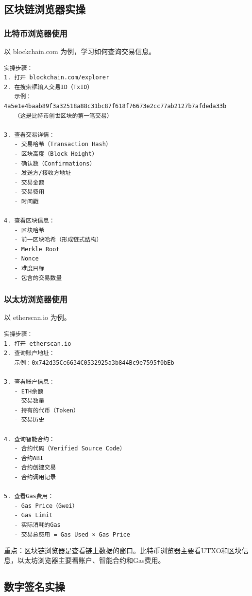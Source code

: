 ﻿\documentclass[12pt,a4paper]{article}
\begin{document}
\subsection{区块链浏览器实操}

\subsubsection{比特币浏览器使用}

以 blockchain.com 为例，学习如何查询交易信息。

\begin{lstlisting}
实操步骤：
1. 打开 blockchain.com/explorer
2. 在搜索框输入交易ID（TxID）
   示例：4a5e1e4baab89f3a32518a88c31bc87f618f76673e2cc77ab2127b7afdeda33b
   （这是比特币创世区块的第一笔交易）

3. 查看交易详情：
   - 交易哈希（Transaction Hash）
   - 区块高度（Block Height）
   - 确认数（Confirmations）
   - 发送方/接收方地址
   - 交易金额
   - 交易费用
   - 时间戳

4. 查看区块信息：
   - 区块哈希
   - 前一区块哈希（形成链式结构）
   - Merkle Root
   - Nonce
   - 难度目标
   - 包含的交易数量
\end{lstlisting}

\subsubsection{以太坊浏览器使用}

以 etherscan.io 为例。

\begin{lstlisting}
实操步骤：
1. 打开 etherscan.io
2. 查询账户地址：
   示例：0x742d35Cc6634C0532925a3b844Bc9e7595f0bEb
   
3. 查看账户信息：
   - ETH余额
   - 交易数量
   - 持有的代币（Token）
   - 交易历史

4. 查询智能合约：
   - 合约代码（Verified Source Code）
   - 合约ABI
   - 合约创建交易
   - 合约调用记录

5. 查看Gas费用：
   - Gas Price（Gwei）
   - Gas Limit
   - 实际消耗的Gas
   - 交易总费用 = Gas Used × Gas Price
\end{lstlisting}

\begin{keypointbox}
重点：区块链浏览器是查看链上数据的窗口。比特币浏览器主要看UTXO和区块信息，以太坊浏览器主要看账户、智能合约和Gas费用。
\end{keypointbox}

\subsection{数字签名实操}
\end{document}
